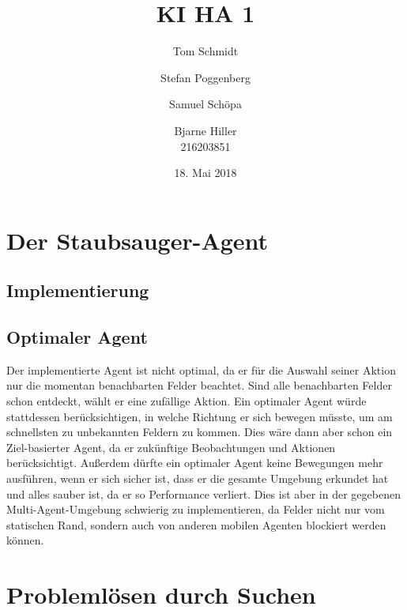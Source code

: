 \documentclass[fleqn]{scrartcl}
\author{Tom Schmidt\\ \and Stefan Poggenberg\\ \and Samuel Schöpa\\ \and Bjarne Hiller\\216203851}
\title{KI HA 1}
\date{18. Mai 2018}
\begin{document}
\maketitle
\section{Der Staubsauger-Agent}
\subsection{Implementierung}

\subsection{Optimaler Agent}
Der implementierte Agent ist nicht optimal, da er für die Auswahl seiner Aktion nur die momentan benachbarten Felder beachtet. Sind alle benachbarten Felder schon entdeckt, wählt er eine zufällige Aktion. Ein optimaler Agent würde stattdessen berücksichtigen, in welche Richtung er sich bewegen müsste, um am schnellsten zu unbekannten Feldern zu kommen. Dies wäre dann aber schon ein Ziel-basierter Agent, da er zukünftige Beobachtungen und Aktionen berücksichtigt. Außerdem dürfte ein optimaler Agent keine Bewegungen mehr ausführen, wenn er sich sicher ist, dass er die gesamte Umgebung erkundet hat und alles sauber ist, da er so Performance verliert. Dies ist aber in der gegebenen Multi-Agent-Umgebung schwierig zu implementieren, da Felder nicht nur vom statischen Rand, sondern auch von anderen mobilen Agenten blockiert werden können.
\section{Problemlösen durch Suchen}
\end{document}
